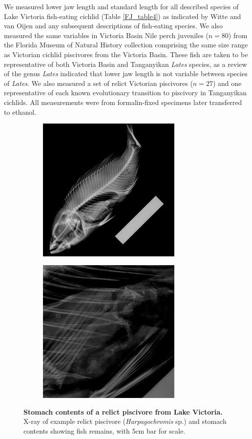 We measured lower jaw length and standard length for all described species of Lake Victoria fish-eating cichlid (Table \ref{FJ_table4}) as indicated by Witte and van Oijen \cite{witte1990taxonomy} and any subsequent descriptions of fish-eating species. \cite{van1991systematic, van1992haplochromis, van2004haplochromis, van2008haplochromis} We also measured the same variables in Victoria Basin Nile perch juveniles ($n=80$) from the Florida Museum of Natural History collection comprising the same size range as Victorian cichlid piscivores from the Victoria Basin. These fish are taken to be representative of both Victoria Basin and Tanganyikan {\em Lates} species, as a review \cite{greenwood1976review} of the genus {\em Lates} indicated that lower jaw length is not variable between species of {\em Lates}. We also measured a set of relict Victorian piscivores ($n=27$) and one representative of each known evolutionary transition to piscivory in Tanganyikan cichlids. All measurements were from formalin-fixed specimens later transferred to ethanol.

\begin{figure}
    \centering
    \begin{subfigure}[t]{2.8in}
        \includegraphics[width=2.8in]{FishJaws/figures/fig7a}
    \end{subfigure}
    \begin{subfigure}[t]{2.8in}
        \includegraphics[width=2.8in]{FishJaws/figures/fig7b}
    \end{subfigure}
    \caption{\textbf{Stomach contents of a relict piscivore from Lake Victoria.} X-ray of example relict piscivore ({\em Harpagochromis} sp.) and stomach contents showing fish remains, with 5cm bar for scale.}
    \label{FJ_fig7}
\end{figure}

